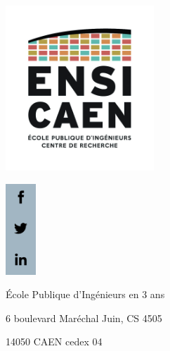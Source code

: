 \documentclass[a4paper]{book}
\begin{document}
\MakeSureLastPageIsEven
{}
\thispagestyle{empty}
\begin{center}
  \includegraphics[width=2.2in]{logos/LogoEnsicaen2017.png}
\end{center}
\vfill
\hspace{18.2cm}\includegraphics[width=0.45in]{logos/SocialNetworks.png}%
\begin{center}
  \huge\color{ensigray}École Publique d'Ingénieurs en 3 ans
\end{center}
\colorbox{ensigray}{
  \begin{minipage}[c]{1\linewidth}
    \center\Large
    \vspace{1em}
    {\color{white}6 boulevard Maréchal Juin, CS 4505}

    {\color{white}14050 CAEN cedex 04}
    \vspace{1em}
  \end{minipage}}\\[18pt]
\end{document}

